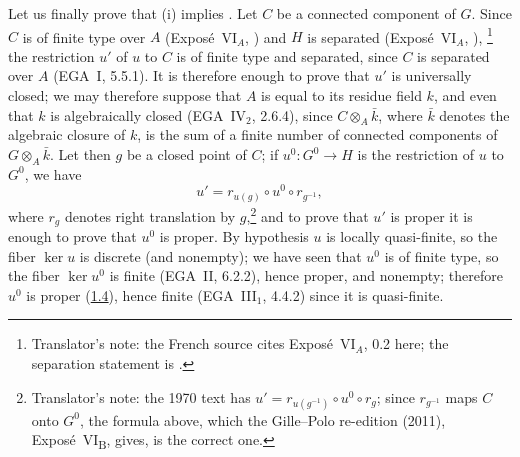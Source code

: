 Let us finally prove that \textup{(i)} implies \textup{}. Let
\(C\) be a connected component of \(G\). Since \(C\) is of finite
type over \(A\) (Expos\'e~VI\(_A\), ) and \(H\) is
separated (Expos\'e~VI\(_A\), ),%
\begingroup
\renewcommand{\thefootnote}{\fnsymbol{footnote}}%
\footnote[1]{\label{note:sga3-VIB-1.4.1-separated-xref}Translator's
note: the French source cites Expos\'e~VI\(_A\), 0.2 here; the
separation statement is .}%
\endgroup{}
the restriction \(u'\) of \(u\) to \(C\) is of finite type and
separated, since \(C\) is separated over \(A\) (EGA~I, 5.5.1). It is
therefore enough to prove that \(u'\) is universally closed; we may
therefore suppose that \(A\) is equal to its residue field \(k\), and
even that \(k\) is algebraically closed (EGA~IV\(_2\), 2.6.4), since
\(C\otimes_A\bar k\), where \(\bar k\) denotes the algebraic closure of
\(k\), is the sum of a finite number of connected components of
\(G\otimes_A\bar k\). Let then \(g\) be a closed point of \(C\); if
\(u^0:G^0\to H\) is the restriction of \(u\) to \(G^0\), we have
\[
  u'=r_{u(g)}\circ u^0\circ r_{g^{-1}},
\]
where \(r_g\) denotes right translation by \(g\),\footnote{Translator's note: the 1970 text has
\(u'=r_{u(g^{-1})}\circ u^0\circ r_g\); since \(r_{g^{-1}}\) maps \(C\) onto \(G^0\), the formula above,
which the Gille--Polo re-edition (2011), Expos\'e~VI\textsubscript{B}, gives, is the correct one.} and to prove that
\(u'\) is proper it is enough to prove that \(u^0\) is proper. By
hypothesis \(u\) is locally quasi-finite, so the fiber \(\ker u\) is
discrete (and nonempty); we have seen that \(u^0\) is of finite type, so
the fiber \(\ker u^0\) is finite (EGA~II, 6.2.2), hence proper, and
nonempty; therefore \(u^0\) is proper (\hyperref[prop:sga3-VIB-1.4]{1.4}), hence finite
(EGA~III\(_1\), 4.4.2) since it is quasi-finite.

